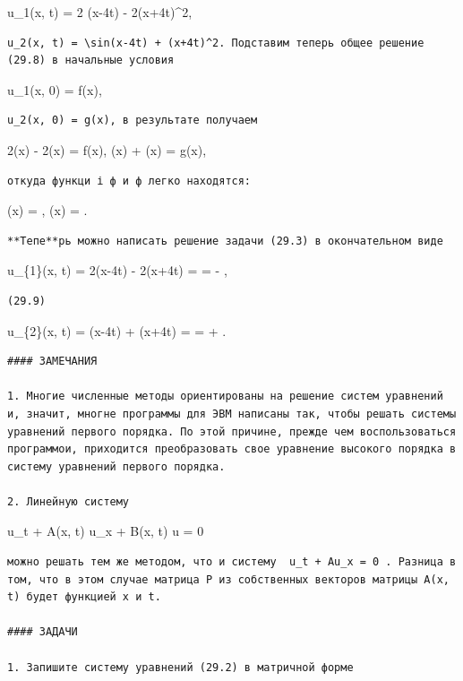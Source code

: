\documentclass[
  ukrainian,
]{article}
\begin{document}
u\_1(x, t) = 2 \sin(x-4t) - 2(x+4t)\^{}2,

\begin{verbatim}
u_2(x, t) = \sin(x-4t) + (x+4t)^2. Подставим теперь общее решение (29.8) в начальные условия
\end{verbatim}

u\_1(x, 0) = f(x),

\begin{verbatim}
u_2(x, 0) = g(x), в результате получаем
\end{verbatim}

2\varphi(x) - 2\psi(x) = f(x), \varphi(x) + \psi(x) = g(x),

\begin{verbatim}
откуда функци і ф и ф легко находятся:
\end{verbatim}

\varphi(x) =  \left[ f(x) + 2g(x) \right], \psi(x) =
 \left[ 2g(x) - f(x) \right].

\begin{verbatim}
**Тепе**рь можно написать решение задачи (29.3) в окончательном виде
\end{verbatim}

u\_\{1\}(x, t) = 2\varphi(x-4t) - 2\psi(x+4t) = = 
\left[ f(x-4t) + 2g(x-4t) \right] - 
\left[ 2g(x+4t) - f(x+4t) \right],

\begin{verbatim}
(29.9)
\end{verbatim}

u\_\{2\}(x, t) = \varphi(x-4t) + \psi(x+4t) = = 
\left[ f(x-4t) + 2g(x-4t) \right] + 
\left[ 2g(x+4t) - f(x+4t) \right].

\begin{verbatim}
#### ЗАМЕЧАНИЯ

1. Многие численные методы ориентированы на решение систем уравнений и, значит, многне программы для ЭВМ написаны так, чтобы решать системы уравнений первого порядка. По этой причине, прежде чем воспользоваться программои, приходится преобразовать свое уравнение высокого порядка в систему уравнений первого порядка.

2. Линейную систему
\end{verbatim}

u\_t + A(x, t) u\_x + B(x, t) u = 0

\begin{verbatim}
можно решать тем же методом, что и систему  u_t + Au_x = 0 . Разница в том, что в этом случае матрица P из собственных векторов матрицы A(x, t) будет функцией x и t.

#### ЗАДАЧИ

1. Запишите систему уравнений (29.2) в матричной форме
\end{verbatim}
\end{document}
